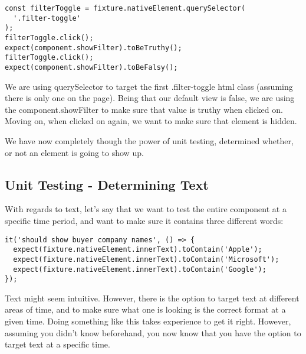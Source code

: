 \begin{lstlisting}
const filterToggle = fixture.nativeElement.querySelector(
  '.filter-toggle'
);
filterToggle.click();
expect(component.showFilter).toBeTruthy();
filterToggle.click();
expect(component.showFilter).toBeFalsy();
\end{lstlisting}

We are using querySelector to target the first .filter-toggle html class
(assuming there is only one on the page). Being that our default view is false,
we are using the component.showFilter to make sure that value is truthy when
clicked on. Moving on, when clicked on again, we want to make sure that element
is hidden. 

We have now completely though the power of unit testing, determined whether, or
not an element is going to show up.

\subsection{ Unit Testing - Determining Text }
With regards to text, let's say that we want to test the entire component at a
specific time period, and want to make sure it contains three different words:
\begin{lstlisting}
it('should show buyer company names', () => {
  expect(fixture.nativeElement.innerText).toContain('Apple');
  expect(fixture.nativeElement.innerText).toContain('Microsoft');
  expect(fixture.nativeElement.innerText).toContain('Google');
});
\end{lstlisting}

Text might seem intuitive. However, there is the option to target text at
different areas of time, and to make sure what one is looking is the correct
format at a given time. Doing something like this takes experience to get it
right. However, assuming you didn't know beforehand, you now know that you have
the option to target text at a specific time.
